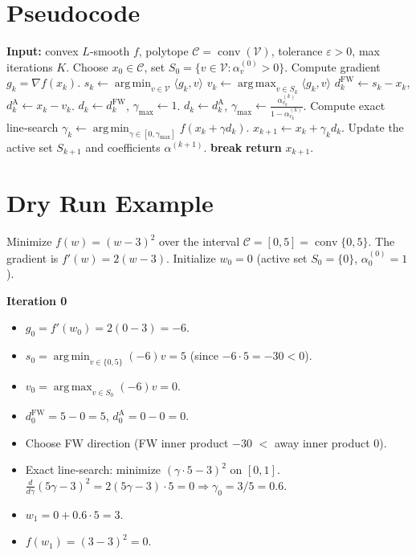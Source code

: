 \documentclass{article}
\newcommand{\conv}{\operatorname{conv}}
\newcommand{\argmin}{\operatorname*{arg\,min}}
\newcommand{\argmax}{\operatorname*{arg\,max}}
\begin{document}
\section*{Pseudocode}
\begin{algorithm}[H]
\caption{Away‑Step Frank–Wolfe (AFW)}
\begin{algorithmic}[1]
\STATE \textbf{Input:} convex $L$‑smooth $f$, polytope $\mathcal C=\conv(\mathcal V)$,
tolerance $\varepsilon>0$, max iterations $K$.
\STATE Choose $x_0\in\mathcal C$, set $S_0=\{v\in\mathcal V:\alpha_v^{(0)}>0\}$.
    \STATE Compute gradient $g_k=\nabla f(x_k)$.
    \STATE $s_k\gets\argmin_{v\in\mathcal V}\langle g_k,v\rangle$   \hfill{}
    \STATE $v_k\gets\argmax_{v\in S_k}\langle g_k,v\rangle$        \hfill{}
    \STATE $d^{\mathrm{FW}}_k\gets s_k-x_k$, $d^{\mathrm{A}}_k\gets x_k-v_k$.
        \STATE $d_k\gets d^{\mathrm{FW}}_k$, $\gamma_{\max}\gets 1$.
    \ELSE
        \STATE $d_k\gets d^{\mathrm{A}}_k$, 
        $\gamma_{\max}\gets \frac{\alpha_{v_k}^{(k)}}{1-\alpha_{v_k}^{(k)}}$.
    \ENDIF
    \STATE Compute exact line‑search 
    $\displaystyle\gamma_k\gets\argmin_{\gamma\in[0,\gamma_{\max}]}
    f(x_k+\gamma d_k)$.
    \STATE $x_{k+1}\gets x_k+\gamma_k d_k$.
    \STATE Update the active set $S_{k+1}$ and coefficients $\alpha^{(k+1)}$.
        \STATE \textbf{break}
    \ENDIF
\ENDFOR
\STATE \textbf{return} $x_{k+1}$.
\end{algorithmic}
\end{algorithm}

\section*{Dry Run Example}
Minimize $f(w)=(w-3)^2$ over the interval $\mathcal C=[0,5]=\conv\{0,5\}$.
The gradient is $f'(w)=2(w-3)$.  
Initialize $w_0=0$ (active set $S_0=\{0\}$, $\alpha^{(0)}_0=1$).

\medskip
\textbf{Iteration 0}
\begin{itemize}
\item $g_0=f'(w_0)=2(0-3)=-6$.
\item $s_0=\argmin_{v\in\{0,5\}}(-6)v=5$ (since $-6\cdot5=-30<0$).
\item $v_0=\argmax_{v\in S_0}(-6)v=0$.
\item $d^{\mathrm{FW}}_0=5-0=5$, $d^{\mathrm{A}}_0=0-0=0$.
\item Choose FW direction (FW inner product $-30$ $<$ away inner product $0$).
\item Exact line‑search: minimize $(\gamma\cdot5-3)^2$ on $[0,1]$.
  $\displaystyle\frac{d}{d\gamma}(5\gamma-3)^2=2(5\gamma-3)\cdot5=0\Rightarrow\gamma_0=3/5=0.6$.
\item $w_1=0+0.6\cdot5=3$.
\item $f(w_1)=(3-3)^2=0$.
\end{itemize}
\end{document}
